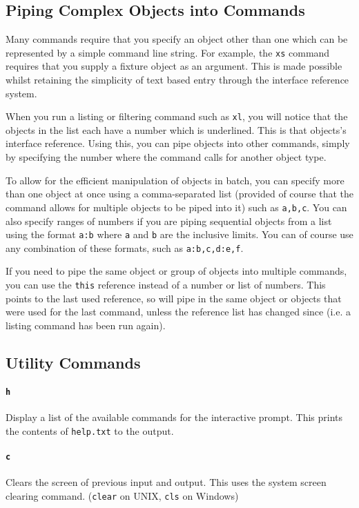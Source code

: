 \documentclass[a4paper]{article}
\begin{document}
\subsection{Piping Complex Objects into Commands}
Many commands require that you specify an object other than one which can be 
represented by a simple command line string. For example, the \texttt{xs} 
command requires that you supply a fixture object as an argument. This is made 
possible whilst retaining the simplicity of text based entry through the 
interface reference system.

When you run a listing or filtering command such as \texttt{xl}, you will 
notice that the objects in the list each have a number which is underlined. 
This is that objects's interface reference. Using this, you can pipe objects
into other commands, simply by specifying the number where the command calls 
for another object type. 

To allow for the efficient manipulation of objects in batch, you can specify 
more than one object at once using a comma-separated list (provided of course 
that the command allows for multiple objects to be piped into it) such as 
\texttt{a,b,c}. You can also specify ranges of numbers if you are piping 
sequential objects from a list using the format \texttt{a:b} where \texttt{a} 
and \texttt{b} are the inclusive limits. You can of course use any 
combination of these formats, such as \texttt{a:b,c,d:e,f}.

If you need to pipe the same object or group of objects into multiple commands, 
you can use the \texttt{this} reference instead of a number or list of numbers. 
This points to the last used reference, so will pipe in the same object or 
objects that were used for the last command, unless the reference list has 
changed since (i.e. a listing command has been run again).

\subsection{Utility Commands}

\paragraph{\texttt{h}}
Display a list of the available commands for the interactive prompt. This 
prints the contents of \texttt{help.txt}  to the output.

\paragraph{\texttt{c}}
Clears the screen of previous input and output. This uses the system screen 
clearing command. (\texttt{clear} on UNIX, \texttt{cls} on Windows)
\end{document}
